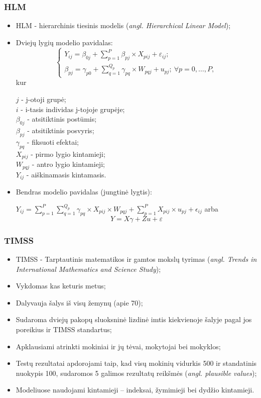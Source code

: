 \documentclass[utf8,hyperref={unicode,pdftex}]{beamer}
\begin{document}
\begin{frame}
\frametitle{HLM}
\begin{itemize}
\item HLM - hierarchinis tiesinis modelis (\textit{angl. Hierarchical Linear Model});
\item Dviejų lygių modelio pavidalas: 
\[ \left\{
  \begin{array}{l}
    Y_{ij} = \beta_{0j}+\sum^P_{p = 1} \beta_{pj}\times X_{pij}+\varepsilon_{ij}; \\
    \beta_{pj} = \gamma_{p0} + \sum^{Q_p}_{q=1}\gamma_{pq}\times W_{pqj}+u_{pj};\ \forall p = 0 , \dots, P,
  \end{array} \right.\]
kur\\
\begin{scriptsize}
$j$ - j-otoji grupė;\\
$i$ - i-tasis individas j-tojoje grupėje;\\
$\beta_{0j}$ - atsitiktinis postūmis;\\
$\beta_{pj}$ - atsitiktinis posvyris;\\
$\gamma_{pq}$ - fiksuoti efektai;\\
$X_{pij}$ - pirmo lygio kintamieji;\\
$W_{pqj}$ - antro lygio kintamieji;\\
$Y_{ij}$ - aiškinamasis kintamasis.\\
\end{scriptsize}

\item Bendras modelio pavidalas (jungtinė lygtis): \begin{small}$ Y_{ij} =\sum^P_{p = 1} \sum^{Q_p}_{q=1}\gamma_{pq}\times X_{pij}\times W_{pqj}+\sum^P_{p = 1} X_{pij}\times u_{pj}+\epsilon_{ij}$ arba
\begin{equation*}
Y=X\gamma+Zu+\varepsilon
\end{equation*}
\end{small}
\end{itemize}
\end{frame}
\begin{frame}
\frametitle{TIMSS}
\begin{itemize}
\item TIMSS - Tarptautinis matematikos ir gamtos mokslų tyrimas (\textit{angl. Trends in International Mathematics and Science Study});
\item Vykdomas kas keturis metus;
\item Dalyvauja šalys iš visų žemynų (apie 70);
\item Sudaroma dviejų pakopų sluoksninė lizdinė imtis kiekvienoje šalyje pagal jos poreikius ir TIMSS standartus;
\item Apklausiami atrinkti mokiniai ir jų tėvai, mokytojai bei mokyklos;
\item Testų rezultatai apdorojami taip, kad visų mokinių vidurkis 500 ir standatinis nuokypis 100, sudaromos 5 galimos rezultatų reikšmės (\textit{angl. plausible values});
\item Modeliuose naudojami kintamieji -- indeksai, žymimieji bei dydžio kintamieji.
\end{itemize}
\end{frame}
\end{document}
